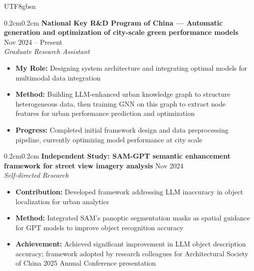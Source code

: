 \documentclass[10pt, letterpaper]{article}
\newenvironment{highlights}{
    \begin{itemize}[
        topsep=0.01cm, parsep=0.01cm, partopsep=0pt, itemsep=0pt,
        leftmargin=2.1em, labelwidth=2em, labelsep=0em,
        align=left
    ]
}{\end{itemize}}
\newenvironment{onecolentry}{\begin{adjustwidth}{0.2cm}{0.2cm}}{\end{adjustwidth}}
\begin{document}
\begin{CJK*}{UTF8}{gbsn}
\begin{onecolentry}
\textbf{National Key R\&D Program of China — Automatic generation and optimization of city-scale green performance models} \hfill Nov 2024 -- Present\\
\textit{Graduate Research Assistant}
  \begin{highlights}
    \item \textbf{My Role:} Designing system architecture and integrating optimal models for multimodal data integration\\[-12pt]
    \item \textbf{Method:} Building LLM-enhanced urban knowledge graph to structure heterogeneous data, then training GNN on this graph to extract node features for urban performance prediction and optimization\\[-12pt]
    \item \textbf{Progress:} Completed initial framework design and data preprocessing pipeline, currently optimizing model performance at city scale
  \end{highlights}
\end{onecolentry}

\vspace{0.15cm}

\begin{onecolentry}
\textbf{Independent Study: SAM-GPT semantic enhancement framework for street view imagery analysis} \hfill Nov 2024\\
\textit{Self-directed Research}
  \begin{highlights}
    \item \textbf{Contribution:} Developed framework addressing LLM inaccuracy in object localization for urban analytics\\[-12pt]
    \item \textbf{Method:} Integrated SAM's panoptic segmentation masks as spatial guidance for GPT models to improve object recognition accuracy\\[-12pt]
    \item \textbf{Achievement:} Achieved significant improvement in LLM object description accuracy; framework adopted by research colleagues for Architectural Society of China 2025 Annual Conference presentation
  \end{highlights}
\end{onecolentry}

\vspace{0.15cm}


\end{CJK*}
\end{document}
